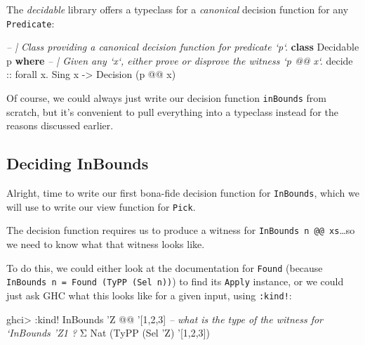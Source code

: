 \documentclass[]{article}
\newenvironment{Shaded}{}{}
\newcommand{\CommentTok}[1]{\textcolor[rgb]{0.38,0.63,0.69}{\textit{#1}}}
\newcommand{\DataTypeTok}[1]{\textcolor[rgb]{0.56,0.13,0.00}{#1}}
\newcommand{\DecValTok}[1]{\textcolor[rgb]{0.25,0.63,0.44}{#1}}
\newcommand{\FunctionTok}[1]{\textcolor[rgb]{0.02,0.16,0.49}{#1}}
\newcommand{\KeywordTok}[1]{\textcolor[rgb]{0.00,0.44,0.13}{\textbf{#1}}}
\newcommand{\NormalTok}[1]{#1}
\newcommand{\OtherTok}[1]{\textcolor[rgb]{0.00,0.44,0.13}{#1}}
\begin{document}
The \emph{decidable} library offers a typeclass for a \emph{canonical} decision
function for any \texttt{Predicate}:

\begin{Shaded}
\begin{Highlighting}[]
\CommentTok{-- | Class providing a canonical decision function for predicate `p`.}
\KeywordTok{class} \DataTypeTok{Decidable}\NormalTok{ p }\KeywordTok{where}
    \CommentTok{-- | Given any `x`, either prove or disprove the witness `p @@ x`.}
\OtherTok{    decide ::}\NormalTok{ forall x}\FunctionTok{.} \DataTypeTok{Sing}\NormalTok{ x }\OtherTok{->} \DataTypeTok{Decision}\NormalTok{ (p }\FunctionTok{@@}\NormalTok{ x)}
\end{Highlighting}
\end{Shaded}

Of course, we could always just write our decision function \texttt{inBounds}
from scratch, but it's convenient to pull everything into a typeclass instead
for the reasons discussed earlier.

\hypertarget{deciding-inbounds}{%
\subsection{Deciding InBounds}\label{deciding-inbounds}}

Alright, time to write our first bona-fide decision function for
\texttt{InBounds}, which we will use to write our view function for
\texttt{Pick}.

The decision function requires us to produce a witness for
\texttt{InBounds\ n\ @@\ xs}\ldots{}so we need to know what that witness looks
like.

To do this, we could either look at the documentation for \texttt{Found}
(because \texttt{InBounds\ n\ =\ Found\ (TyPP\ (Sel\ n))}) to find its
\texttt{Apply} instance, or we could just ask GHC what this looks like for a
given input, using \texttt{:kind!}:

\begin{Shaded}
\begin{Highlighting}[]
\NormalTok{ghci}\FunctionTok{>} \FunctionTok{:}\NormalTok{kind}\FunctionTok{!} \DataTypeTok{InBounds}\NormalTok{ '}\DataTypeTok{Z} \FunctionTok{@@}\NormalTok{ '[}\DecValTok{1}\NormalTok{,}\DecValTok{2}\NormalTok{,}\DecValTok{3}\NormalTok{]  }\CommentTok{-- what is the type of the witness for `InBounds 'Z1 ?}
\NormalTok{Σ }\DataTypeTok{Nat}\NormalTok{ (}\DataTypeTok{TyPP}\NormalTok{ (}\DataTypeTok{Sel}\NormalTok{ '}\DataTypeTok{Z}\NormalTok{) '[}\DecValTok{1}\NormalTok{,}\DecValTok{2}\NormalTok{,}\DecValTok{3}\NormalTok{])}
\end{Highlighting}
\end{Shaded}
\end{document}
